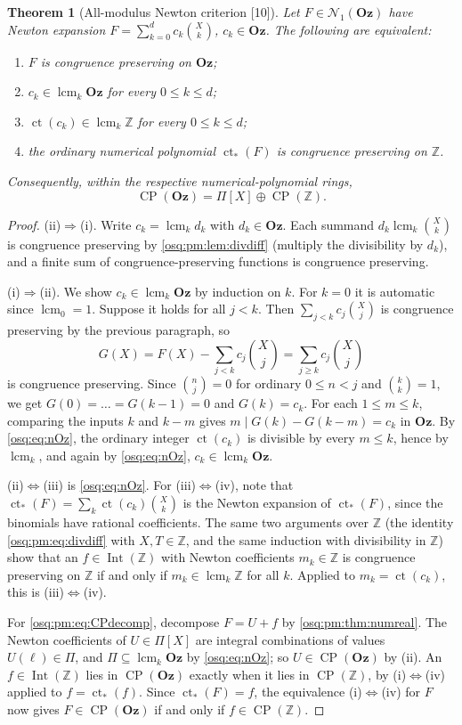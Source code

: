 \documentclass[11pt,letterpaper]{article}
\numberwithin{equation}{section}
\newtheorem{theorem}{Theorem}[section]
\theoremstyle{definition}
\theoremstyle{remark}
\theoremstyle{plain}
\newcommand{\Oz}{\mathbf{Oz}}
\newcommand{\Z}{\mathbb Z}
\newcommand{\ct}{\operatorname{ct}}
\newcommand{\Int}{\operatorname{Int}}
\newcommand{\Num}{\mathscr N}
\newcommand{\CP}{\operatorname{CP}}
\newcommand{\lcm}{\operatorname{lcm}}
\newcommand{\src}[1]{\textup{\textsf{[#1]}}}
\begin{document}
\begin{theorem}[All-modulus Newton criterion \src{10}]\label{osq:pm:thm:cp}
Let $F\in\Num_1(\Oz)$ have Newton expansion $F=\sum_{k=0}^dc_k\binom Xk$, $c_k\in\Oz$.
The following are equivalent:
\begin{enumerate}
 \item $F$ is congruence preserving on $\Oz$;
 \item $c_k\in\lcm_k\Oz$ for every $0\le k\le d$;
 \item $\ct(c_k)\in\lcm_k\Z$ for every $0\le k\le d$;
 \item the ordinary numerical polynomial $\ct_*(F)$ is congruence preserving on $\Z$.
\end{enumerate}
Consequently, within the respective numerical-polynomial rings,
\begin{equation}\label{osq:pm:eq:CPdecomp}
 \CP(\Oz)=\Pi[X]\oplus\CP(\Z).
\end{equation}
\end{theorem}
\begin{proof}
(ii)$\Rightarrow$(i). Write $c_k=\lcm_kd_k$ with $d_k\in\Oz$. Each summand
$d_k\lcm_k\binom Xk$ is congruence preserving by \cref{osq:pm:lem:divdiff} (multiply the
divisibility by $d_k$), and a finite sum of congruence-preserving functions is congruence
preserving.

(i)$\Rightarrow$(ii). We show $c_k\in\lcm_k\Oz$ by induction on $k$. For $k=0$ it is
automatic since $\lcm_0=1$. Suppose it holds for all $j<k$. Then
$\sum_{j<k}c_j\binom Xj$ is congruence preserving by the previous paragraph, so
\[
 G(X)=F(X)-\sum_{j<k}c_j\binom Xj=\sum_{j\ge k}c_j\binom Xj
\]
is congruence preserving. Since $\binom nj=0$ for ordinary $0\le n<j$ and
$\binom kk=1$, we get $G(0)=\dots=G(k-1)=0$ and $G(k)=c_k$. For each $1\le m\le k$,
comparing the inputs $k$ and $k-m$ gives $m\mid G(k)-G(k-m)=c_k$ in $\Oz$. By
\eqref{osq:eq:nOz}, the ordinary integer $\ct(c_k)$ is divisible by every $m\le k$, hence
by $\lcm_k$, and again by \eqref{osq:eq:nOz}, $c_k\in\lcm_k\Oz$.

(ii)$\Leftrightarrow$(iii) is \eqref{osq:eq:nOz}. For (iii)$\Leftrightarrow$(iv), note
that $\ct_*(F)=\sum_k\ct(c_k)\binom Xk$ is the Newton expansion of $\ct_*(F)$, since the
binomials have rational coefficients. The same two arguments over $\Z$ (the identity
\eqref{osq:pm:eq:divdiff} with $X,T\in\Z$, and the same induction with divisibility in
$\Z$) show that an $f\in\Int(\Z)$ with Newton coefficients $m_k\in\Z$ is congruence
preserving on $\Z$ if and only if $m_k\in\lcm_k\Z$ for all $k$. Applied to $m_k=\ct(c_k)$,
this is (iii)$\Leftrightarrow$(iv).

For \eqref{osq:pm:eq:CPdecomp}, decompose $F=U+f$ by \cref{osq:pm:thm:numreal}. The Newton
coefficients of $U\in\Pi[X]$ are integral combinations of values $U(\ell)\in\Pi$, and
$\Pi\subseteq\lcm_k\Oz$ by \eqref{osq:eq:nOz}; so $U\in\CP(\Oz)$ by (ii). An
$f\in\Int(\Z)$ lies in $\CP(\Oz)$ exactly when it lies in $\CP(\Z)$, by
(i)$\Leftrightarrow$(iv) applied to $f=\ct_*(f)$. Since $\ct_*(F)=f$, the equivalence
(i)$\Leftrightarrow$(iv) for $F$ now gives $F\in\CP(\Oz)$ if and only if $f\in\CP(\Z)$.
\end{proof}
\end{document}
